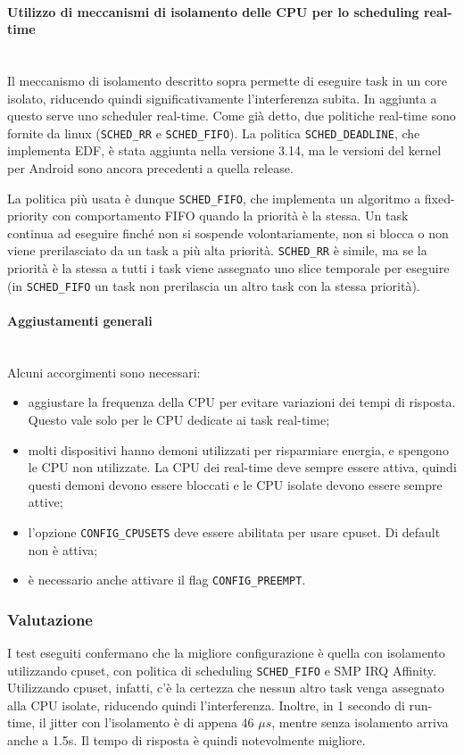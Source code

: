 \paragraph{Utilizzo di meccanismi di isolamento delle CPU per lo scheduling real-time} \mbox{} \\
Il meccanismo di isolamento descritto sopra permette di eseguire task in un core isolato, riducendo quindi significativamente l'interferenza subita. In aggiunta a questo serve uno scheduler real-time. Come già detto, due politiche real-time sono fornite da linux (\texttt{SCHED\_RR} e \texttt{SCHED\_FIFO}). La politica \texttt{SCHED\_DEADLINE}, che implementa EDF, è stata aggiunta nella versione 3.14, ma le versioni del kernel per Android sono ancora precedenti a quella release.

La politica più usata è dunque \texttt{SCHED\_FIFO}, che implementa un algoritmo a fixed-priority con comportamento FIFO quando la priorità è la stessa. Un task continua ad eseguire finché non si sospende volontariamente, non si blocca o non viene prerilasciato da un task a più alta priorità. \texttt{SCHED\_RR} è simile, ma se la priorità è la stessa a tutti i task viene assegnato uno slice temporale per eseguire (in \texttt{SCHED\_FIFO} un task non prerilascia un altro task con la stessa priorità).

\paragraph{Aggiustamenti generali} \mbox{} \\
Alcuni accorgimenti sono necessari:
\begin{itemize}
	\item aggiustare la frequenza della CPU per evitare variazioni dei tempi di risposta. Questo vale solo per le CPU dedicate ai task real-time;
	\item molti dispositivi hanno demoni utilizzati per risparmiare energia, e spengono le CPU non utilizzate. La CPU dei real-time deve sempre essere attiva, quindi questi demoni devono essere bloccati e le CPU isolate devono essere sempre attive;
	\item l'opzione \texttt{CONFIG\_CPUSETS} deve essere abilitata per usare cpuset. Di default non è attiva;
	\item è necessario anche attivare il flag \texttt{CONFIG\_PREEMPT}.
\end{itemize}

\subsubsection{Valutazione}
I test eseguiti confermano che la migliore configurazione è quella con isolamento utilizzando cpuset, con politica di scheduling \texttt{SCHED\_FIFO} e SMP IRQ Affinity. Utilizzando cpuset, infatti, c'è la certezza che nessun altro task venga assegnato alla CPU isolate, riducendo quindi l'interferenza. Inoltre, in 1 secondo di run-time, il jitter con l'isolamento è di appena 46 $\mu s$, mentre senza isolamento arriva anche a 1.5s. Il tempo di risposta è quindi notevolmente migliore.

